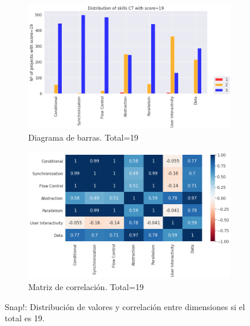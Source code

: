 \documentclass[a4paper, 12pt]{book}
\begin{document}
\begin{figure}[H]
    \centering
    \begin{subfigure}[h]{.49\textwidth} 
        \includegraphics[width=\textwidth]{img/distribucion_19_Snap}
        \caption{Diagrama de barras. Total=19}
        \label{fig:total19_Snap}
    \end{subfigure}       
    \begin{subfigure}[h]{.49\textwidth} 
        \includegraphics[width=\textwidth]{img/corr_19_Snap}
        \caption{Matriz de correlación. Total=19}
        \label{fig:corr19_Snap}
    \end{subfigure}
    \caption{Snap!: Distribución de valores y correlación entre dimensiones si el total es 19.}
\end{figure}
\end{document}
